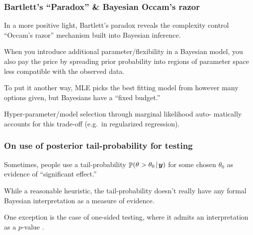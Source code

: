 \documentclass[18pt]{beamer}
\renewcommand{\textsc}[1]{{\small \MakeUppercase{#1}}}
\newcommand{\given}{\mskip.7\thinmuskip | \mskip.7\thinmuskip}
\DeclareMathOperator{\probability}{\mathbb{P}}
\newcommand{\by}{\bm{y}}
\begin{document}
\begin{frame}
\frametitle{Bartlett's ``Paradox'' \& Bayesian Occam's razor}
In a more positive light, Bartlett's paradox reveals the complexity control ``Occam's razor'' mechanism built into Bayesian inference.

\pause
\smallskip
When you introduce additional parameter/flexibility in a Bayesian model, you also pay the price by spreading prior probability into regions of parameter space less compatible with the observed data.

\pause
\smallskip
To put it another way, \textsc{mle} picks the best fitting model from however many options given, but Bayesians have a ``fixed budget.''

\pause
\smallskip
Hyper-parameter/model selection through marginal likelihood auto- matically accounts for this trade-off (e.g.\ in regularized regression).
\end{frame}


\begin{frame}
\frametitle{On use of posterior tail-probability for testing}
Sometimes, people use a tail-probability $\probability( \theta > \theta_0 \given \by )$ for some chosen $\theta_0$ as evidence of ``significant effect.''

\pause
\smallskip
While a reasonable heuristic, the tail-probability doesn't really have any formal Bayesian interpretation as a measure of evidence.

\pause
\smallskip
One exception is the case of one-sided testing, where it admits an interpretation as a $p$-value \citep{casella1987onesided_testing}.

\end{frame}
\end{document}

